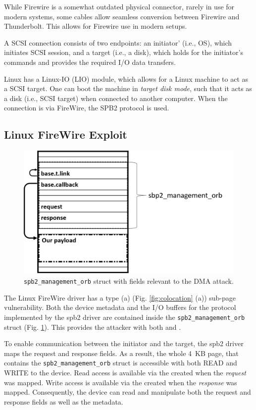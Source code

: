 While Firewire is a somewhat outdated physical connector, rarely in use for modern systems, some cables allow seamless conversion between Firewire and Thunderbolt. This allows for Firewire use in modern setups.

A SCSI connection consists of two endpoints: an initiator' (i.e., OS), which initiates SCSI session, and a target (i.e., a disk), which holds for the initiator's commands and provides the required I/O data transfers. 

Linux has a Linux-IO (LIO) module, which allows for a Linux machine to act as a SCSI target. One can boot the machine in \emph{target disk mode}, such that it acts as a disk (i.e., SCSI target) when connected to another computer. When the connection is via FireWire, the SPB2 protocol is used.

\subsection{Linux FireWire Exploit} \label{sec:sbp2_attack}
\begin{figure}
    \centering
    \includegraphics[width=1\linewidth]{figs/sbp.png}
    \caption{\texttt{spb2\_management\_orb} struct with fields relevant to the DMA attack.}
    \label{fig:orb}
\end{figure}

The Linux FireWire driver has a type (a) (Fig. \ref{fig:colocation} (a)) sub-page vulnerability. Both the device metadata and the I/O buffers for the \spb{} protocol implemented by the spb2 driver are contained inside the \texttt{spb2\_management\_orb} struct (Fig. \ref{fig:orb}). This provides the attacker with both \means{} and \oportunity{}.

To enable communication between the initiator and the target, the spb2 driver maps the request and response fields. As a result, the whole 4~KB page, that contains the \texttt{spb2\_management\_orb} struct is accessible with both READ and WRITE to the device. Read access is available via the \iova{} created when the \emph{request} was mapped. Write access is available via the \iova{} created when the \emph{response} was mapped. Consequently, the device can read and manipulate both the request and response fields as well as the metadata. 

